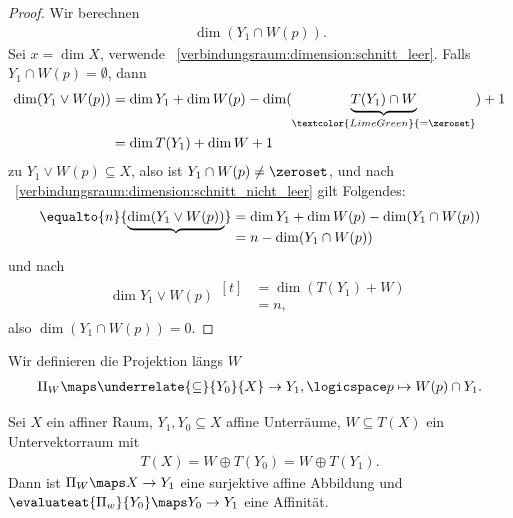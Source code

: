 \begin{proof}
    Wir berechnen
    \begin{align*}
        \dim(Y_1\cap W(p)).
    \end{align*}
    Sei \( x=\dim X \), verwende ~\ref{verbindungsraum:dimension:schnitt_leer}.
    Falls \( Y_1\cap W(p)=\emptyset \), dann
    \begin{align*}
        \dim(Y_1\vee W(p))\begin{aligned}[t] 
            &=\dim Y_1+\dim W(p)-\dim(\underbrace{T(Y_1)\cap W}_{\textcolor{LimeGreen}{=\zeroset}})+1\\
            &=\dim T(Y_1)+\dim W+1
        \end{aligned}
    \end{align*}
    \contra zu \( Y_1\vee W(p)\subseteq X \), also ist \( Y_1\cap W(p)\neq \zeroset \), und nach ~\ref{verbindungsraum:dimension:schnitt_nicht_leer} gilt Folgendes:
    \begin{align*}
        \equalto{n}{\underbrace{\dim (Y_1\vee W(p))}}\begin{aligned}[t] 
            &=\dim Y_1+\dim W(p)-\dim(Y_1\cap W(p))\\
            &=n-\dim(Y_1\cap W(p))
        \end{aligned}
    \end{align*}
    und nach 
    \begin{align*}
        \dim Y_1\vee W(p)\begin{aligned}[t] 
            &=\dim(T(Y_1)+W)\\
            &=n,
        \end{aligned}
    \end{align*}
    also \( \dim(Y_1\cap W(p))=0 \).
    
\end{proof}
Wir definieren die Projektion längs \( W \)
\begin{align*}
    \Pi_W\maps \underrelate{\subseteq}{Y_0}{X}\to Y_1,\logicspace p\mapsto W(p)\cap Y_1.
\end{align*}
\begin{satz}
    Sei \( X \) ein affiner Raum, \( Y_1,Y_0\subseteq X \) affine Unterräume, \( W\subseteq T(X) \) ein Untervektorraum mit 
    \begin{align*}
        T(X)=W\oplus T(Y_0)=W\oplus T(Y_1).
    \end{align*}
    Dann ist \( \Pi_W\maps X\to Y_1 \) eine surjektive affine Abbildung und \( \evaluateat{\Pi_w}{Y_0}\maps Y_0\to Y_1 \) eine Affinität.
\end{satz}
